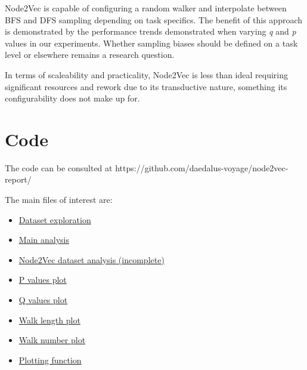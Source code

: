 \documentclass[a4paper,10pt]{article}
\begin{document}
Node2Vec is capable of configuring a random walker and interpolate between BFS and DFS sampling depending on task specifics. The benefit of this approach is demonstrated by the performance trends demonstrated when varying \textit{q} and \textit{p} values in our experiments. Whether sampling biases should be defined on a task level or elsewhere remains a research question.

In terms of scaleability and practicality, Node2Vec is less than ideal requiring significant resources and rework due to its transductive nature, something its configurability does not make up for.

\section{Code}

The code can be consulted at https://github.com/daedalus-voyage/node2vec-report/

The main files of interest are:

\begin{itemize}
\item \href{https://github.com/daedalus-voyage/node2vec-report/blob/main/cora_dataset.ipynb}{Dataset exploration}
\item \href{https://github.com/daedalus-voyage/node2vec-report/blob/main/cora_node2vec.ipynb}{Main analysis}
\item \href{https://github.com/daedalus-voyage/node2vec-report/blob/main/run_pq_variations_keras.ipynb}{Node2Vec dataset analysis (incomplete)}
\item \href{https://github.com/daedalus-voyage/node2vec-report/blob/main/pvals_plot.m}{P values plot}
\item \href{https://github.com/daedalus-voyage/node2vec-report/blob/main/qvals_plot.m}{Q values plot}
\item \href{https://github.com/daedalus-voyage/node2vec-report/blob/main/walk_length_plot.m}{Walk length plot}
\item \href{https://github.com/daedalus-voyage/node2vec-report/blob/main/walk_number_plot.m}{Walk number plot}
\item \href{https://github.com/daedalus-voyage/node2vec-report/blob/main/plot_performance.m}{Plotting function}
\end{itemize}


\end{document}
